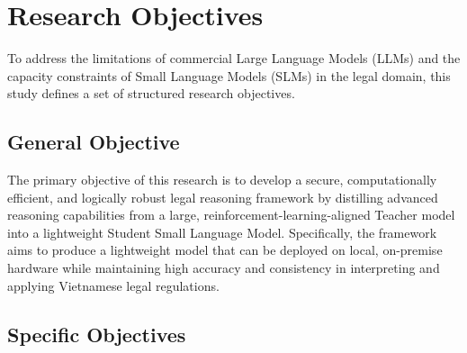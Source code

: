 \section{Research Objectives}

To address the limitations of commercial Large Language Models (LLMs) and the capacity constraints of Small Language Models (SLMs) in the legal domain, this study defines a set of structured research objectives.

\subsection{General Objective}

The primary objective of this research is to develop a secure, computationally efficient, and logically robust legal reasoning framework by distilling advanced reasoning capabilities from a large, reinforcement-learning-aligned Teacher model into a lightweight Student Small Language Model. Specifically, the framework aims to produce a lightweight model that can be deployed on local, on-premise hardware while maintaining high accuracy and consistency in interpreting and applying Vietnamese legal regulations.

\subsection{Specific Objectives}

